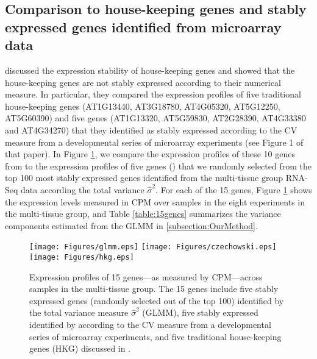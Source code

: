 		
		
		\subsection{Comparison to house-keeping genes and stably expressed genes
			identified from microarray data}\label{section:CompareStablyExpressedGene}
		\cite{czechowski2005genome} discussed the expression stability of
		house-keeping genes and showed that the house-keeping genes are not stably
		expressed according to their numerical measure. In particular, they compared
		the expression profiles of five traditional house-keeping genes (AT1G13440,
		AT3G18780, AT4G05320, AT5G12250, AT5G60390) and five genes (AT1G13320,
		AT5G59830, AT2G28390, AT4G33380 and AT4G34270) that they identified  as stably
		expressed according to the CV measure from a developmental series of
		microarray experiments (see Figure 1 of that paper).  
		In Figure \ref{expressionlevel1}, we compare the expression profiles 
		of these 10 genes from \cite{czechowski2005genome} to the expression profiles
		of five genes (\SelectFiveGene) that we
		randomly selected from the top 100 most stably expressed genes identified from
		the multi-tissue group RNA-Seq data according the total variance $\hat\sigma^2$.
		For each of the 15 genes, Figure \ref{expressionlevel1} shows the expression levels measured
		in CPM over \howmanytissuesample samples in the eight experiments in the multi-tissue group,
		and Table \ref{table:15genes} summarizes the variance components estimated from the
		GLMM in \ref{subsection:OurMethod}. 
		
		\begin{figure}[htbp]
			\begin{center}
				\texttt{[image: Figures/glmm.eps]}
				\texttt{[image: Figures/czechowski.eps]}
				\texttt{[image: Figures/hkg.eps]}
				\caption{Expression profiles of 15 genes---as measured by CPM---across \howmanytissuesample
					samples in the multi-tissue group. The 15 genes include 
					five stably expressed genes (randomly selected out of the top 100)
					identified by the total variance measure $\hat{\sigma}^2$ (GLMM), five stably
					expressed identified by \citet{czechowski2005genome} according to the CV measure from a
					developmental series of microarray experiments, and five
					traditional house-keeping genes (HKG) discussed in
					\citet{czechowski2005genome}. 
				}
				\label{expressionlevel1}
			\end{center}
		\end{figure} 
		
